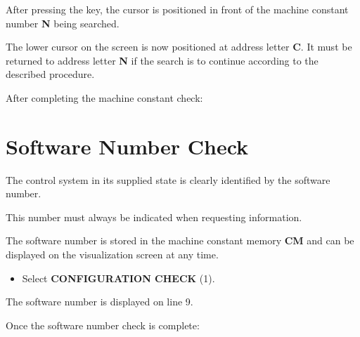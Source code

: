 \vspace{.5cm}

\begin{itemize}
\end{itemize}

After pressing the key, the cursor is positioned in front of the machine constant number \textbf{N} being searched.

The lower cursor on the screen is now positioned at address letter \textbf{C}.  
It must be returned to address letter \textbf{N} if the search is to continue according to the described procedure.

After completing the machine constant check:

\begin{itemize}
\end{itemize}
\vspace{.5cm}
\section{Software Number Check}

The control system in its supplied state is clearly identified by the software number.

This number must always be indicated when requesting information.

The software number is stored in the machine constant memory \textbf{CM} and can be displayed on the visualization screen at any time.

\procedure

\begin{itemize}
\end{itemize}

\begin{itemize}
    \item Select \textbf{CONFIGURATION CHECK} (1).
\end{itemize}

The software number is displayed on line 9.

Once the software number check is complete:

\begin{itemize}
\end{itemize}


